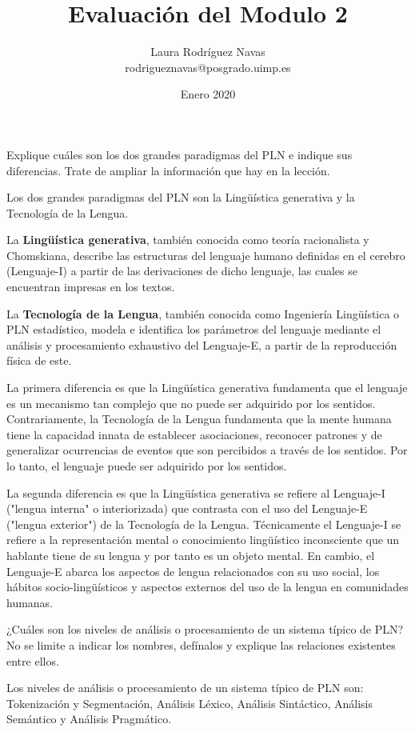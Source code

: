 \documentclass{exam}
\title{Evaluación del Modulo 2}
\author{Laura Rodríguez Navas \\ rodrigueznavas@posgrado.uimp.es}
\date{Enero 2020}
\begin{document}
	
\maketitle

\begin{questions}
\question Explique cuáles son los dos grandes paradigmas del PLN e indique sus diferencias. Trate de ampliar la información que hay en la lección.

Los dos grandes paradigmas del PLN son la Lingüística generativa y la Tecnología de la Lengua.

La {\bf Lingüística generativa}, también conocida como teoría racionalista y Chomskiana, describe las estructuras del lenguaje humano definidas en el cerebro (Lenguaje-I) a partir de las derivaciones de dicho lenguaje, las cuales se encuentran
impresas en los textos.
	
La {\bf Tecnología de la Lengua}, también conocida como Ingeniería Lingüística o PLN estadístico, modela e identifica los parámetros del lenguaje mediante el análisis y procesamiento exhaustivo del Lenguaje-E, a partir de la reproducción física de este.

La primera diferencia es que la Lingüística generativa fundamenta que el lenguaje es un mecanismo tan complejo que no puede ser adquirido por los sentidos. Contrariamente, la Tecnología de la Lengua fundamenta que la mente humana tiene la capacidad innata de establecer asociaciones, reconocer patrones y de generalizar ocurrencias de eventos que son percibidos a través de los sentidos. Por lo tanto, el lenguaje puede ser adquirido por los sentidos.

La segunda diferencia es que la Lingüística generativa se refiere al Lenguaje-I ("lengua interna" o interiorizada) que contrasta con el uso del Lenguaje-E ("lengua exterior") de la Tecnología de la Lengua. Técnicamente el Lenguaje-I se refiere a la representación mental o conocimiento lingüístico inconsciente que un hablante tiene de su lengua y por tanto es un objeto mental. En cambio, el Lenguaje-E abarca los aspectos de lengua relacionados con su uso social, los hábitos socio-lingüísticos y aspectos externos del uso de la lengua en comunidades humanas. 

\question ¿Cuáles son los niveles de análisis o procesamiento de un sistema típico de PLN? No se limite a indicar los nombres, defínalos y explique las relaciones existentes entre ellos.

Los niveles de análisis o procesamiento de un sistema típico de PLN son: Tokenización y Segmentación, Análisis Léxico, Análisis Sintáctico, Análisis Semántico y Análisis Pragmático.


\end{questions}
\end{document}
